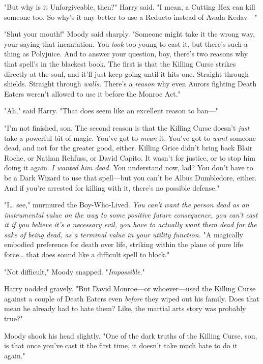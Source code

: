 "But why is it Unforgiveable, then?" Harry said. "I mean, a Cutting Hex can
kill someone too. So why's it any better to use a Reducto instead of Avada
Kedav---"

"Shut your mouth!" Moody said sharply. "Someone might take it the wrong way,
your saying that incantation. You \emph{look} too young to cast it, but there's
such a thing as Polyjuice. And to answer your question, boy, there's two
reasons why that spell's in the blackest book. The first is that the Killing
Curse strikes directly at the soul, and it'll just keep going until it hits
one. Straight through shields. Straight through \emph{walls.} There's a
\emph{reason} why even Aurors fighting Death Eaters weren't allowed to use it
before the Monroe Act."

"Ah," said Harry. "That does seem like an excellent reason to ban---"

"I'm not finished, son. The second reason is that the Killing Curse doesn't
\emph{just} take a powerful bit of magic. You've got to \emph{mean} it. You've
got to \emph{want} someone dead, and not for the greater good, either. Killing
Grice didn't bring back Blair Roche, or Nathan Rehfuss, or David Capito. It
wasn't for justice, or to stop him doing it again. \emph{I wanted him dead.}
You understand now, lad? You don't have to be a Dark Wizard to use that
spell---but you can't be Albus Dumbledore, either. And if you're arrested for
killing with it, there's no possible defense."

"I{\ldots} see," murmured the Boy-Who-Lived. \emph{You can't want the person
dead as an instrumental value on the way to some positive future consequence,
you can't cast it if you believe it's a necessary evil, you have to actually
want them dead for the sake of being dead, as a terminal value in your utility
function.} "A magically embodied preference for death over life, striking
within the plane of pure life force{\ldots} that does sound like a difficult
spell to block."

"Not difficult," Moody snapped. "\emph{Impossible}."

Harry nodded gravely. "But David Monroe---or whoever---used the Killing Curse
against a couple of Death Eaters even \emph{before} they wiped out his family.
Does that mean he already had to hate them? Like, the martial arts story was
probably true?"

Moody shook his head slightly. "One of the dark truths of the Killing Curse,
son, is that once you've cast it the first time, it doesn't take much hate to
do it again."

